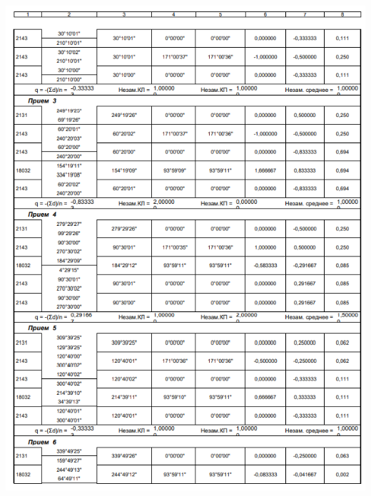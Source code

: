 \documentclass[a4paper]{article}
\begin{document}
\begin{newpage}
\begin{center}
        \includegraphics[scale=1.4]{vedomosty/скп7.png}

\end{center}
\end{newpage}
\end{document}
